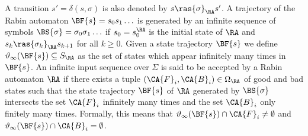 A transition $s' = \delta(s, \sigma)$ is also denoted by $s \ras{\sigma}_\RA s'$.
A trajectory of the Rabin automaton $\BF{s} = s_0 s_1 \ldots$ is generated by
an infinite sequence of symbols $\BS{\sigma} = \sigma_0 \sigma_1 \ldots$ if
$s_0 = s_0^\RA$ is the initial state of $\RA$ and $s_k \ras{\sigma_k}_\RA s_{k+1}$
for all $k \geq 0$.
Given a state trajectory $\BF{s}$ we define $\vartheta_\infty(\BF{s}) \subseteq S_\RA$
as the set of states which appear infinitely many times in $\BF{s}$.
An infinite input sequence over $\Sigma$ is said to be accepted by a Rabin automaton
$\RA$ if there exists a tuple $(\CA{F}_i, \CA{B}_i) \in \Omega_\RA$ of good and bad
states such that the state trajectory $\BF{s}$ of $\RA$ generated by $\BS{\sigma}$
intersects the set $\CA{F}_i$ infinitely many times and the set $\CA{B}_i$ only finitely
many times.
Formally, this means that $\vartheta_\infty(\BF{s}) \cap \CA{F}_i \neq \emptyset$
and $\vartheta_\infty(\BF{s}) \cap \CA{B}_i = \emptyset$.


